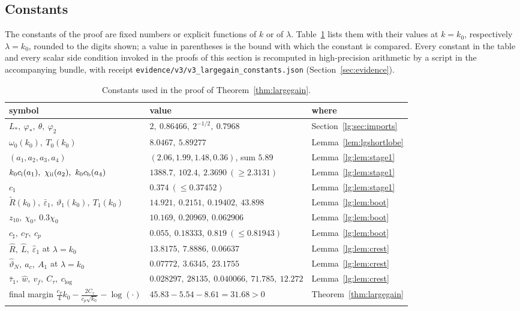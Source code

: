\subsection{Constants}\label{lg:sec:constants}
The constants of the proof are fixed numbers or explicit functions of $k$ or of $\lambda$. Table~\ref{lg:tab:constants} lists them with their values at $k=k_0$, respectively $\lambda=k_0$, rounded to the digits shown; a value in parentheses is the bound with which the constant is compared. Every constant in the table and every scalar side condition invoked in the proofs of this section is recomputed in high-precision arithmetic by a script in the accompanying bundle, with receipt \texttt{evidence/v3/v3\_largegain\_constants.json} (Section~\ref{sec:evidence}).
\begin{table}[ht]
\centering\small
\caption{Constants used in the proof of Theorem~\ref{thm:largegain}.}\label{lg:tab:constants}
\begin{tabular}{@{}lll@{}}\toprule
symbol & value & where\\\midrule
$L_\ast,\ \varphi_\ast,\ \theta,\ \varphi_2$ & $2,\ 0.86466,\ 2^{-1/2},\ 0.7968$ & Section~\ref{lg:sec:imports}\\
$\omega_0(k_0),\ T_0(k_0)$ & $8.0467,\ 5.89277$ & Lemma~\ref{lem:lgshortlobe}\\
$(a_1,a_2,a_3,a_4)$ & $(2.06,1.99,1.48,0.36)$, sum $5.89$ & Lemma~\ref{lg:lem:stage1}\\
$k_0c_{\rm i}(a_1),\ \chi_{\rm ii}(a_2),\ k_0c_{\rm b}(a_4)$ & $1388.7,\ 102.4,\ 2.3690\ (\ge2.3131)$ & Lemma~\ref{lg:lem:stage1}\\
$c_1$ & $0.374\ (\le0.37452)$ & Lemma~\ref{lg:lem:stage1}\\
$\tilde R(k_0),\ \bar\varepsilon_1,\ \vartheta_1(k_0),\ T_1(k_0)$ & $14.921,\ 0.2151,\ 0.19402,\ 43.898$ & Lemma~\ref{lg:lem:boot}\\
$z_{10},\ \chi_0,\ 0.3\chi_0$ & $10.169,\ 0.20969,\ 0.062906$ & Lemma~\ref{lg:lem:boot}\\
$c_\sharp,\ c_T,\ c_p$ & $0.055,\ 0.18333,\ 0.819\ (\le0.81943)$ & Lemma~\ref{lg:lem:boot}\\
$\hat R,\ \hat L,\ \hat\varepsilon_1$ at $\lambda=k_0$ & $13.8175,\ 7.8886,\ 0.06637$ & Lemma~\ref{lg:lem:crest}\\
$\hat\vartheta_N,\ a_c,\ A_1$ at $\lambda=k_0$ & $0.07772,\ 3.6345,\ 23.1755$ & Lemma~\ref{lg:lem:crest}\\
$\bar\tau_1,\ \hat w,\ v_f,\ C_\tau,\ c_{\log}$ & $0.028297,\ 28135,\ 0.040066,\ 71.785,\ 12.272$ & Lemma~\ref{lg:lem:crest}\\
final margin $\tfrac{c_T}{4}k_0-\tfrac{2C_\tau}{c_p\sqrt{k_0}}-\log(\cdot)$ & $45.83-5.54-8.61=31.68>0$ & Theorem~\ref{thm:largegain}\\\bottomrule
\end{tabular}
\end{table}

